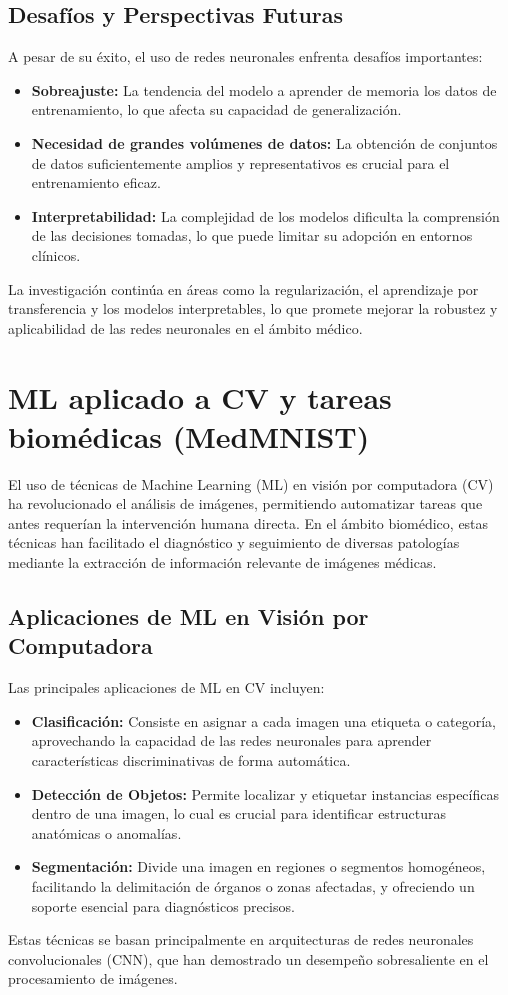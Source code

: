 \documentclass[11pt,spanish,listoffigures,listoftables]{tfgetsinf}
\begin{document}
\subsection{Desafíos y Perspectivas Futuras}
A pesar de su éxito, el uso de redes neuronales enfrenta desafíos importantes:
\begin{itemize}
    \item \textbf{Sobreajuste:} La tendencia del modelo a aprender de memoria los datos de entrenamiento, lo que afecta su capacidad de generalización.
    \item \textbf{Necesidad de grandes volúmenes de datos:} La obtención de conjuntos de datos suficientemente amplios y representativos es crucial para el entrenamiento eficaz.
    \item \textbf{Interpretabilidad:} La complejidad de los modelos dificulta la comprensión de las decisiones tomadas, lo que puede limitar su adopción en entornos clínicos.
\end{itemize}
La investigación continúa en áreas como la regularización, el aprendizaje por transferencia y los modelos interpretables, lo que promete mejorar la robustez y aplicabilidad de las redes neuronales en el ámbito médico.



\section{ML aplicado a CV y tareas biomédicas (MedMNIST)}
El uso de técnicas de Machine Learning (ML) en visión por computadora (CV) ha revolucionado el análisis de imágenes, permitiendo automatizar tareas que antes requerían la intervención humana directa. En el ámbito biomédico, estas técnicas han facilitado el diagnóstico y seguimiento de diversas patologías mediante la extracción de información relevante de imágenes médicas.

\subsection{Aplicaciones de ML en Visión por Computadora}
Las principales aplicaciones de ML en CV incluyen:
\begin{itemize}
    \item \textbf{Clasificación:} Consiste en asignar a cada imagen una etiqueta o categoría, aprovechando la capacidad de las redes neuronales para aprender características discriminativas de forma automática.
    \item \textbf{Detección de Objetos:} Permite localizar y etiquetar instancias específicas dentro de una imagen, lo cual es crucial para identificar estructuras anatómicas o anomalías.
    \item \textbf{Segmentación:} Divide una imagen en regiones o segmentos homogéneos, facilitando la delimitación de órganos o zonas afectadas, y ofreciendo un soporte esencial para diagnósticos precisos.
\end{itemize}
Estas técnicas se basan principalmente en arquitecturas de redes neuronales convolucionales (CNN), que han demostrado un desempeño sobresaliente en el procesamiento de imágenes.
\end{document}
